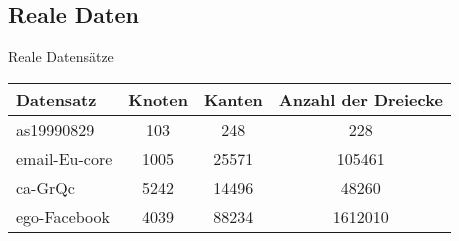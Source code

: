 \subsection{Reale Daten}

\begin{frame}{Reale Datensätze}
\begin{table}
    \centering
    \begin{tabular}{lccc}
        \toprule
        Datensatz & Knoten & Kanten & Anzahl der Dreiecke \\
        \midrule
        as19990829 & 103 & 248 & 228 \\
        email-Eu-core & 1005 & 25571 & 105461 \\
        ca-GrQc & 5242 & 14496 & 48260 \\
        ego-Facebook & 4039 & 88234 & 1612010 \\
        \bottomrule
    \end{tabular}
\end{table}
\end{frame}

